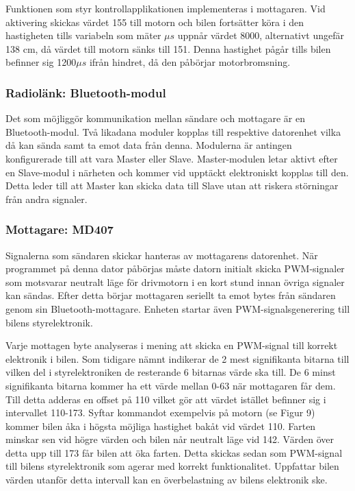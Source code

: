 \documentclass[a4paper]{article}
\begin{document}
\vspace{5mm} \noindent
Funktionen som styr kontrollapplikationen implementeras i mottagaren. Vid aktivering skickas värdet 155 till motorn  och bilen fortsätter köra i den hastigheten tills variabeln som mäter $\mu s$ uppnår värdet 8000, alternativt ungefär 138 cm, då värdet till motorn sänks till 151. Denna hastighet pågår tills bilen befinner sig 1200$\mu s$ ifrån hindret, då den påbörjar motorbromsning.


\subsubsection{Radiolänk: Bluetooth-modul}
Det som möjliggör kommunikation mellan sändare och mottagare är en Bluetooth-modul. Två likadana moduler kopplas till respektive datorenhet vilka då kan sända samt ta emot data från denna. Modulerna är antingen konfigurerade till att vara Master eller Slave. Master-modulen letar aktivt efter en Slave-modul i närheten och kommer vid upptäckt elektroniskt kopplas till den. Detta leder till att Master kan skicka data till Slave utan att riskera störningar från andra signaler.


\subsubsection{Mottagare: MD407}
Signalerna som sändaren skickar hanteras av mottagarens datorenhet. När programmet på denna dator påbörjas måste datorn initialt skicka PWM-signaler som motsvarar neutralt läge för drivmotorn i en kort stund innan övriga signaler kan sändas. Efter detta börjar mottagaren seriellt ta emot bytes från sändaren genom sin Bluetooth-mottagare. Enheten startar även PWM-signalsgenerering till bilens styrelektronik. 

\vspace{5mm} \noindent
Varje mottagen byte analyseras i mening att skicka en PWM-signal till korrekt elektronik i bilen. Som tidigare nämnt indikerar de 2 mest signifikanta bitarna till vilken del i styrelektroniken de resterande 6 bitarnas värde ska till. De 6 minst signifikanta bitarna kommer ha ett värde mellan 0-63 när mottagaren får dem. Till detta adderas en offset på 110 vilket gör att värdet istället befinner sig i intervallet 110-173. Syftar kommandot exempelvis på motorn (se Figur 9) kommer bilen åka i högsta möjliga hastighet bakåt vid värdet 110. Farten minskar sen vid högre värden och bilen når neutralt läge vid 142. Värden över detta upp till 173 får bilen att öka farten. Detta skickas sedan som PWM-signal till bilens styrelektronik som agerar med korrekt funktionalitet. Uppfattar bilen värden utanför detta intervall kan en överbelastning av bilens elektronik ske. 
\end{document}
